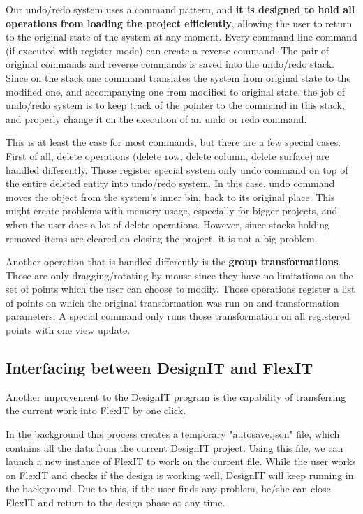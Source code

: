 \documentclass[a4paper, 11pt, article]{report}
\begin{document}
Our undo/redo system uses a command pattern, and \textbf{it is designed to hold all operations from loading the project efficiently}, allowing the user to return to the original state of the system at any moment. Every command line command (if executed with register mode) can create a reverse command. The pair of original commands and reverse commands is saved into the undo/redo stack. Since on the stack one command translates the system from original state to the modified one, and accompanying one from modified to original state, the job of undo/redo system is to keep track of the pointer to the command in this stack, and properly change it on the execution of an undo or redo command. 

This is at least the case for most commands, but there are a few special cases. First of all, delete operations (delete row, delete column, delete surface) are handled differently. Those register special system only undo command on top of the entire deleted entity into undo/redo system. In this case, undo command moves the object from the system's inner bin, back to its original place. This might create problems with memory usage, especially for bigger projects, and when the user does a lot of delete operations. However, since stacks holding removed items are cleared on closing the project, it is not a big problem. 

Another operation that is handled differently is the \textbf{group transformations}. Those are only dragging/rotating by mouse since they have no limitations on the set of points which the user can choose to modify. Those operations register a list of points on which the original transformation was run on and transformation parameters. A special command only runs those transformation on all registered points with one view update.

\subsection{Interfacing between DesignIT and FlexIT}

Another improvement to the DesignIT program is the capability of transferring the current work into FlexIT by one click. 

In the background this process creates a temporary "autosave.json" file, which contains all the data from the current DesignIT project. Using this file, we can launch a new instance of FlexIT to work on the current file. While the user works on FlexIT and checks if the design is working well, DesignIT will keep running in the background. Due to this, if the user finds any problem, he/she can close FlexIT and return to the design phase at any time.
\end{document}
